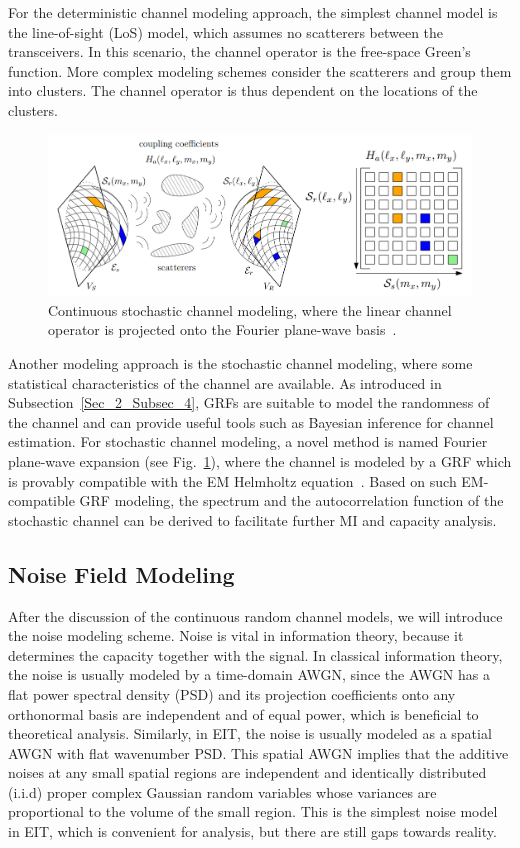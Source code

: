 \documentclass[journal,twocolumn]{IEEEtran}
\begin{document}
For the deterministic channel modeling approach, the simplest channel model is the line-of-sight (LoS) model, which assumes no scatterers between the transceivers. In this scenario, the channel operator is the free-space Green's function. More complex modeling schemes consider the scatterers and group them into clusters. The channel operator is thus dependent on the locations of the clusters.

\begin{figure}
	\centering 
	\includegraphics[width=\linewidth]{figures/random_channel.png} 
	\caption{Continuous stochastic channel modeling, where the linear channel operator is projected onto the Fourier plane-wave basis~\cite{marzetta2022fourier}.} 
	\label{fig:marzetta}
\end{figure}
Another modeling approach is the stochastic channel modeling, where some statistical characteristics of the channel are available. As introduced in Subsection~\ref{Sec_2_Subsec_4}, GRFs are suitable to model the randomness of the channel and can provide useful tools such as Bayesian inference for channel estimation. 
For stochastic channel modeling, a novel method is named Fourier plane-wave expansion (see Fig.~\ref{fig:marzetta}), where the channel is modeled by a GRF which is provably compatible with the EM Helmholtz equation~\cite{marzetta2022fourier}. 
Based on such EM-compatible GRF modeling, the spectrum and the autocorrelation function of the stochastic channel can be derived to facilitate further MI and capacity analysis.

\subsection{Noise Field Modeling}
After the discussion of the continuous random channel models, we will introduce the noise modeling scheme. 
Noise is vital in information theory, because it determines the capacity together with the signal. 
In classical information theory, the noise is usually modeled by a time-domain AWGN, since the AWGN has a flat power spectral density (PSD) and its projection coefficients onto any orthonormal basis are independent and of equal power, which is beneficial to theoretical analysis. 
Similarly, in EIT, the noise is usually modeled as a spatial AWGN with flat wavenumber PSD. This spatial AWGN implies that the additive noises at any small spatial regions are independent and identically distributed (i.i.d) proper complex Gaussian random variables whose variances are proportional to the volume of the small region. This is the simplest noise model in EIT, which is convenient for analysis, but there are still gaps towards reality. 
\end{document}
